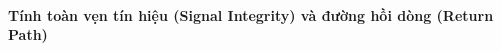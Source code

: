                 \paragraph{Tính toàn vẹn tín hiệu (Signal Integrity) và đường hồi dòng (Return Path)}
                        
                        

